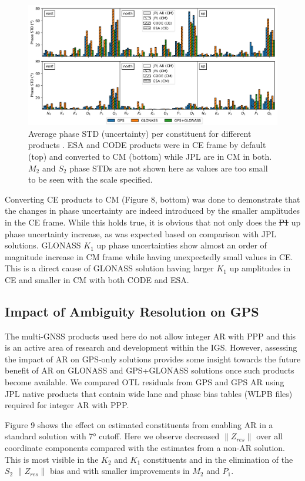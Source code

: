\documentclass[se, manuscript]{copernicus}
\providecommand{\DIFadd}[1]{{\protect\color{blue}\uwave{#1}}} %
\providecommand{\DIFdel}[1]{{\protect\color{red}\sout{#1}}}                      %
\providecommand{\DIFaddbegin}{} %
\providecommand{\DIFaddend}{} %
\providecommand{\DIFdelbegin}{} %
\providecommand{\DIFdelend}{} %
\providecommand{\DIFaddFL}[1]{\DIFadd{#1}} %
\providecommand{\DIFaddbeginFL}{} %
\providecommand{\DIFaddendFL}{} %
\begin{document}
\begin{figure}[t]
\includegraphics[width=17cm]{fig08.png}
\caption{Average phase STD (uncertainty) per constituent for different products \DIFaddbeginFL \DIFaddFL{as returned by Eterna}\DIFaddendFL . ESA and CODE products were in CE frame by default (top) and converted to CM (bottom) while JPL are in CM in both. $M_2$ and $S_2$ phase STDs are not shown here as values are too small to be seen with the scale specified.}
\end{figure}
Converting CE products to CM (Figure 8, bottom) was done to demonstrate that the changes in phase uncertainty are indeed introduced by the smaller amplitudes in the CE frame. While this holds true, it is obvious that not only does the \DIFdelbegin \DIFdel{P1 }\DIFdelend \DIFaddbegin \DIFadd{$P_1$ }\DIFaddend up phase uncertainty increase, as was expected based on comparison with JPL solutions. GLONASS $K_1$ up phase uncertainties show almost an order of magnitude increase in CM frame while having unexpectedly small values in CE. This is a direct cause of GLONASS solution having larger $K_1$ up amplitudes in CE and smaller in CM with both CODE and ESA.

\subsection{Impact of Ambiguity Resolution on GPS}
The multi-GNSS products used here do not allow integer AR with PPP and this is an active area of research and development within the IGS. However, assessing the impact of AR on GPS-only solutions provides some insight towards the future benefit of AR on GLONASS and GPS+GLONASS solutions once such products become available. We compared OTL residuals from GPS and GPS AR using JPL native products that contain wide lane and phase bias tables (WLPB files) required for integer AR with PPP.

Figure 9 shows the effect on estimated constituents from enabling AR in a standard solution with 7° cutoff. Here we observe decreased $\|Z_{res}\|$ over all coordinate components compared with the estimates from a non-AR solution. This is most visible in the $K_2$ and $K_1$ constituents and in the elimination of the $S_2$ $\|Z_{res}\|$ bias and with smaller improvements in $M_2$ and $P_1$.
\end{document}
